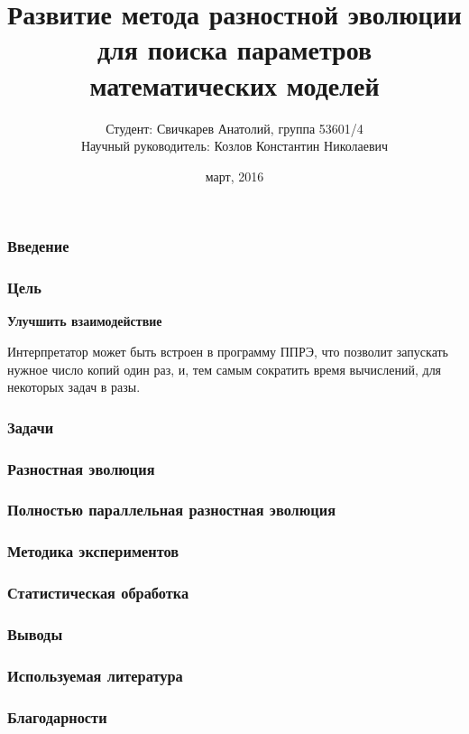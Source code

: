 \documentclass{beamer}
\begin{document}
\title[Развитие ППРЭ]
{Развитие метода разностной эволюции
для поиска параметров математических моделей}
\author[Свичкарев Анатолий]
{Студент: Свичкарев Анатолий, группа 53601/4\\
Научный руководитель: Козлов Константин Николаевич}
\date{март, 2016}

\frame{\titlepage} 

\begin{frame}
\frametitle{Введение}
\end{frame}

\begin{frame}
\frametitle{Цель}
\textbf{Улучшить взаимодействие}

\bigskip
Интерпретатор может
быть встроен в программу ППРЭ,
что позволит запускать
нужное число копий один раз,
и, тем самым сократить время вычислений,
для некоторых задач в разы.
\end{frame}

\begin{frame}
\frametitle{Задачи}
\end{frame}

\begin{frame}
\frametitle{Разностная эволюция}
\end{frame}

\begin{frame}
\frametitle{Полностью параллельная разностная эволюция}
\end{frame}

\begin{frame}
\frametitle{Методика экспериментов}
\end{frame}

\begin{frame}
\frametitle{Статистическая обработка}
\end{frame}

\begin{frame}
\frametitle{Выводы}
\end{frame}

\begin{frame}
\frametitle{Используемая литература}
\end{frame}

\begin{frame}
\frametitle{Благодарности}
\end{frame}
\end{document}
